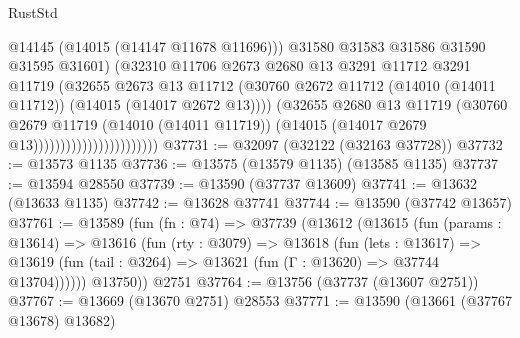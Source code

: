 \begin{lexlean}{RustStd}
\begin{coremodule}
                                            @14145
                                            (@14015 (@14147 @11678 @11696)))
                                          @31580
                                          @31583
                                          @31586
                                          @31590
                                          @31595
                                          @31601)
                                        (@32310
                                          @11706
                                          @2673
                                          @2680
                                          @13
                                          @3291
                                          @11712
                                          @3291
                                          @11719
                                          (@32655
                                            @2673
                                            @13
                                            @11712
                                            (@30760
                                              @2672
                                              @11712
                                              (@14010 (@14011 @11712))
                                              (@14015 (@14017 @2672 @13))))
                                          (@32655
                                            @2680
                                            @13
                                            @11719
                                            (@30760
                                              @2679
                                              @11719
                                              (@14010 (@14011 @11719))
                                              (@14015 (@14017 @2679 @13)))))))))))))))))))))))
@37731 := @32097 (@32122 (@32163 @37728))
@37732 := @13573 @1135
@37736 := @13575 (@13579 @1135) (@13585 @1135)
@37737 := @13594 @28550
@37739 := @13590 (@37737 @13609)
@37741 := @13632 (@13633 @1135)
@37742 := @13628 @37741
@37744 := @13590 (@37742 @13657)
@37761 := @13589
    (fun (fn : @74) =>
    @37739
      (@13612
        (@13615
          (fun (params : @13614) =>
          @13616
            (fun (rty : @3079) =>
            @13618
              (fun (lets : @13617) =>
              @13619 (fun (tail : @3264) => @13621 (fun (Γ : @13620) => @37744 @13704))))))
        @13750))
    @2751
@37764 := @13756 (@37737 (@13607 @2751))
@37767 := @13669 (@13670 @2751) @28553
@37771 := @13590 (@13661 (@37767 @13678) @13682)

\end{coremodule}
\end{lexlean}
